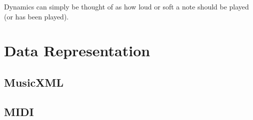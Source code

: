\begin{appendices}
Dynamics can simply be thought of as how loud or soft a note should be played (or has been played). 

\section{Data Representation} \label{ase:app_one_sect_2}
    
\subsection{MusicXML}
\subsection{MIDI}
\end{appendices}